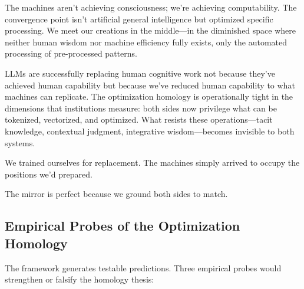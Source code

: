 The machines aren't achieving consciousness; we're achieving computability. The convergence point isn't artificial general intelligence but optimized specific processing. We meet our creations in the middle---in the diminished space where neither human wisdom nor machine efficiency fully exists, only the automated processing of pre-processed patterns.

LLMs are successfully replacing human cognitive work not because they've achieved human capability but because we've reduced human capability to what machines can replicate. The optimization homology is operationally tight in the dimensions that institutions measure: both sides now privilege what can be tokenized, vectorized, and optimized. What resists these operations---tacit knowledge, contextual judgment, integrative wisdom---becomes invisible to both systems.

We trained ourselves for replacement. The machines simply arrived to occupy the positions we'd prepared.

The mirror is perfect because we ground both sides to match.

\subsection{Empirical Probes of the Optimization Homology}

The framework generates testable predictions. Three empirical probes would strengthen or falsify the homology thesis:

